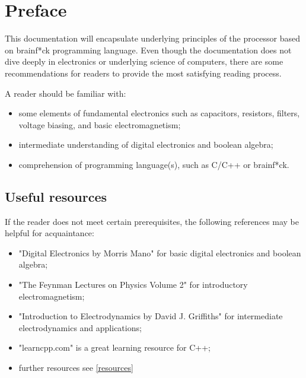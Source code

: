 \section{Preface} \label{sec:preface}
This documentation will encapsulate underlying principles of the processor based on brainf*ck programming language. Even though the documentation does not dive deeply in electronics or underlying science of computers, there are some recommendations for readers to provide the most satisfying reading process. 

A reader should be familiar with:
\begin{itemize}
	\item some elements of fundamental electronics such as capacitors, resistors, filters, voltage biasing, and basic electromagnetism;
	\item intermediate understanding of digital electronics and boolean algebra;
	\item comprehension of programming language(s), such as C/C++ or brainf*ck.
\end{itemize}

\subsection{Useful resources}
If the reader does not meet certain prerequisites, the following references may be helpful for acquaintance:
\begin{itemize}
	\item "Digital Electronics by Morris Mano" for basic digital electronics and boolean algebra;
	\item "The Feynman Lectures on Physics Volume 2" for introductory electromagnetism;
	\item "Introduction to Electrodynamics by David J. Griffiths" for intermediate electrodynamics and applications;
	\item "learncpp.com" is a great learning resource for C++;
	\item further resources see \ref{resources}
\end{itemize}
